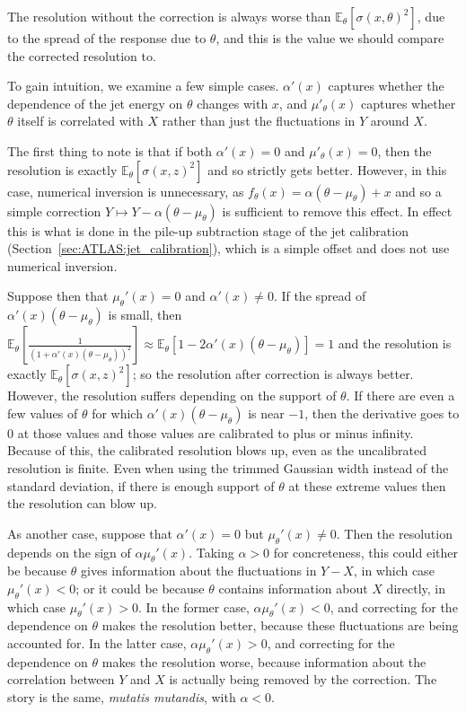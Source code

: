 The resolution without the correction is always worse than $\mathbb{E}_\theta\left[\sigma(x,\theta)^2\right]$, due to the spread of the response due to $\theta$, and this is the value we should compare the corrected resolution to.

To gain intuition, we examine a few simple cases. $\alpha'(x)$ captures whether the dependence of the jet energy on $\theta$ changes with $x$, and $\mu'_\theta(x)$ captures whether $\theta$ itself is correlated with $X$ rather than just the fluctuations in $Y$ around $X$.

The first thing to note is that if both $\alpha'(x)=0$ and $\mu'_\theta(x)=0$, then the resolution is exactly $\mathbb{E}_\theta\left[\sigma(x,z)^2\right]$ and so strictly gets better.
However, in this case, numerical inversion is unnecessary, as $f_\theta(x) = \alpha(\theta-\mu_\theta)+x$ and so a simple correction $Y \mapsto Y-\alpha(\theta-\mu_\theta)$ is sufficient to remove this effect.
In effect this is what is done in the pile-up subtraction stage of the jet calibration (Section~\ref{sec:ATLAS:jet_calibration}), which is a simple offset and does not use numerical inversion.

Suppose then that $\mu_\theta'(x)=0$ and $\alpha'(x) \ne 0$.
If the spread of $\alpha'(x)(\theta-\mu_\theta)$ is small, then $\mathbb{E}_\theta\left[\frac{1}{(1+\alpha'(x)(\theta-\mu_\theta))^2}\right] \approx \mathbb{E}_\theta\left[1-2\alpha'(x)(\theta-\mu_\theta)\right] = 1$ and the resolution is exactly $\mathbb{E}_\theta\left[\sigma(x,z)^2\right]$; so the resolution after correction is always better.
However, the resolution suffers depending on the support of $\theta$.
If there are even a few values of $\theta$ for which $\alpha'(x)(\theta-\mu_\theta)$ is near $-1$, then the derivative goes to $0$ at those values and those values are calibrated to plus or minus infinity.
Because of this, the calibrated resolution blows up, even as the uncalibrated resolution is finite.
Even when using the trimmed Gaussian width instead of the standard deviation, if there is enough support of $\theta$ at these extreme values then the resolution can blow up.

As another case, suppose that $\alpha'(x)=0$ but $\mu_\theta'(x) \ne 0$.
Then the resolution depends on the sign of $\alpha\mu_\theta'(x)$.
Taking $\alpha>0$ for concreteness, this could either be because $\theta$ gives information about the fluctuations in $Y-X$, in which case $\mu_\theta'(x)<0$; or it could be because $\theta$ contains information about $X$ directly, in which case $\mu_\theta'(x) > 0$.
In the former case, $\alpha\mu_\theta'(x)<0$, and correcting for the dependence on $\theta$ makes the resolution better, because these fluctuations are being accounted for.
In the latter case, $\alpha\mu_\theta'(x)>0$, and correcting for the dependence on $\theta$ makes the resolution worse, because information about the correlation between $Y$ and $X$ is actually being removed by the correction.
The story is the same, \textit{mutatis mutandis}, with $\alpha<0$.

